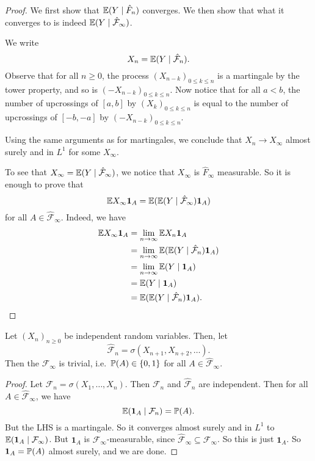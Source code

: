 \documentclass[a4paper]{article}
\begin{document}
\begin{proof}
  We first show that $\E(Y \mid \hat{F}_n)$ converges. We then show that what it converges to is indeed $\E(Y \mid \hat{\mathcal{F}}_\infty)$.

  We write
  \[
    X_n = \E(Y \mid \hat{\mathcal{F}}_n).
  \]
  Observe that for all $n \geq 0$, the process $(X_{n - k})_{0 \leq k \leq n}$ is a martingale by the tower property, and so is $(-X_{n - k})_{0 \leq k \leq n}$. Now notice that for all $a < b$, the number of upcrossings of $[a, b]$ by $(X_k)_{0 \leq k \leq n}$ is equal to the number of upcrossings of $[-b, -a]$ by $(-X_{n - k})_{0 \leq k \leq n}$.

  Using the same arguments as for martingales, we conclude that $X_n \to X_\infty$ almost surely and in $L^1$ for some $X_\infty$.

  To see that $X_\infty = \E(Y \mid \hat{\mathcal{F}}_\infty)$, we notice that $X_\infty$ is $\hat{F}_\infty$ measurable. So it is enough to prove that
  \[
    \E X_\infty \mathbf{1}_A = \E(\E(Y \mid \hat{\mathcal{F}}_\infty) \mathbf{1}_A)
  \]
  for all $A \in \hat{\mathcal{F}}_\infty$. Indeed, we have
  \begin{align*}
    \E X_\infty \mathbf{1}_A &= \lim_{n \to \infty} \E X_n \mathbf{1}_A\\
    &= \lim_{n\to \infty} \E(\E (Y \mid \hat{\mathcal{F}}_n) \mathbf{1}_A)\\
    &= \lim_{n \to \infty} \E(Y \mid \mathbf{1}_A)\\
    &= \E(Y \mid \mathbf{1}_A)\\
    &= \E(\E (Y \mid \hat{\mathcal{F}}_n) \mathbf{1}_A).\qedhere
  \end{align*}
\end{proof}


\begin{thm}
  Let $(X_n)_{n \geq 0}$ be independent random variables. Then, let
  \[
    \hat{\mathcal{F}}_n = \sigma (X_{n + 1}, X_{n + 2}, \ldots).
  \]
  Then the  $\hat{\mathcal{F}}_{\infty}$ is trivial, i.e.\ $\P(A) \in \{0, 1\}$ for all $A \in \hat{\mathcal{F}}_\infty$.
\end{thm}

\begin{proof}
  Let $\mathcal{F}_n = \sigma(X_1, \ldots, X_n)$. Then $\mathcal{F}_n$ and $\hat{\mathcal{F}}_n$ are independent. Then for all $A \in \hat{\mathcal{F}}_\infty$, we have
  \[
    \E(\mathbf{1}_A \mid \mathcal{F}_n) = \P(A).
  \]
  But the LHS is a martingale. So it converges almost surely and in $L^1$ to $\E(\mathbf{1}_A \mid \mathcal{F}_\infty)$. But $\mathbf{1}_A$ is $\mathcal{F}_\infty$-measurable, since $\hat{\mathcal{F}}_\infty \subseteq \mathcal{F}_\infty$. So this is just $\mathbf{1}_A$. So $\mathbf{1}_A = \P(A)$ almost surely, and we are done.
\end{proof}
\end{document}

